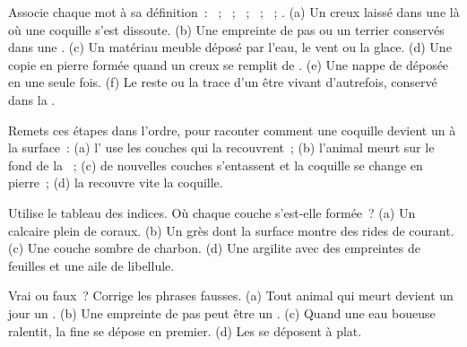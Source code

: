\begin{exercise}[$\star$]\label{exo:g7:sediments-and-fossils:1}
Associe chaque mot à sa définition~: ~; ~; ~;
~; ~; . (a) Un creux laissé dans une  là où
une coquille s'est dissoute. (b) Une empreinte de pas ou un terrier
conservés dans une . (c) Un matériau meuble déposé par l'eau, le vent
ou la glace. (d) Une copie en pierre formée quand un creux se remplit de
. (e) Une nappe de  déposée en une seule fois. (f) Le
reste ou la trace d'un être vivant d'autrefois, conservé dans la .
\end{exercise}

\begin{exercise}[$\star$]\label{exo:g7:sediments-and-fossils:2}
Remets ces étapes dans l'ordre, pour raconter comment une coquille devient
un  à la surface~: (a) l' use les couches qui la
recouvrent~; (b) l'animal meurt sur le fond de la ~; (c) de nouvelles
couches s'entassent et la coquille se change en pierre~; (d) la 
recouvre vite la coquille.
\end{exercise}

\begin{exercise}[$\star$]\label{exo:g7:sediments-and-fossils:3}
Utilise le tableau des indices. Où chaque couche s'est-elle formée~? (a)
Un calcaire plein de coraux. (b) Un grès dont la surface montre des rides
de courant. (c) Une couche sombre de charbon. (d) Une argilite avec des
empreintes de feuilles et une aile de libellule.
\end{exercise}

\begin{exercise}[$\star$]\label{exo:g7:sediments-and-fossils:4}
Vrai ou faux~? Corrige les phrases fausses. (a) Tout animal qui meurt
devient un jour un . (b) Une empreinte de pas peut être un .
(c) Quand une eau boueuse ralentit, la  fine se dépose en premier. (d)
Les  se déposent à plat.
\end{exercise}

